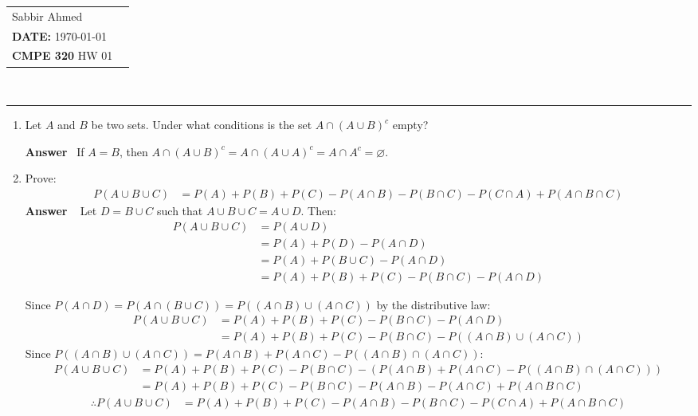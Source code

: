 \documentclass[paper=usletter, fontsize=12pt]{article}
\newcommand{\documentinfo}[5]{
    \begin{centering}
        \parbox{2in}{
        \begin{spacing}{1}
            \begin{flushleft}
                \begin{tabular}{l l}
                    #1 \\
                    #2 \\
                    #3 \\
                \end{tabular}\\
                \rule{\textwidth}{1pt}
            \end{flushleft}
        \end{spacing}
        }
    \end{centering}
}
\newcommand{\ans}{\textbf{Answer} \ }
\begin{document}
    \documentinfo{Sabbir Ahmed}{\textbf{DATE:} \today}{\textbf{CMPE 320} HW 01}
    \vspace{-0.2in}

    \begin{enumerate}

        \item Let $A$ and $B$ be two sets. Under what conditions is the set $A
        \cap (A \cup B)^c$ empty?

        \ans If $A = B$, then $A \cap (A \cup B)^c = A \cap (A \cup A)^c = A
        \cap A^c = \varnothing$.

        \item Prove:
        \begin{align*}
            P(A \cup B \cup C) & = P(A) + P(B) + P(C) - P(A \cap B) - P(B
            \cap C) - P(C \cap A) + P(A \cap B \cap C)
        \end{align*}
        \ans
        Let $D = B \cup C$ such that $A \cup B \cup C = A \cup D$. Then:
        \begin{align*}
            P(A \cup B \cup C) & = P(A \cup D) \\
            & = P(A) + P(D) - P(A \cap D) \\
            & = P(A) + P(B \cup C) - P(A \cap D) \\
            & = P(A) + P(B) + P(C) - P(B \cap C) - P(A \cap D)
        \end{align*}

        Since $P(A \cap D) = P(A \cap (B \cup C) ) = P((A \cap B) \cup (A \cap
        C))$ by the distributive law:
        \begin{align*}
        P(A \cup B \cup C) & = P(A) + P(B) + P(C) - P(B \cap C) - P(A \cap
        D) \\
        & = P(A) + P(B) + P(C) - P(B \cap C) - P((A \cap B) \cup (A \cap C))
        \end{align*}
        Since $P((A \cap B) \cup (A \cap C)) = P(A \cap B) + P(A \cap C) - P((A
        \cap B) \cap (A \cap C))$:
        \begin{align*}
        P(A \cup B \cup C) & = P(A) + P(B) + P(C) - P(B \cap C) - (P(A \cap B)
        + P(A \cap C) - P((A \cap B) \cap (A \cap C))) \\
        & = P(A) + P(B) + P(C) - P(B \cap C) - P(A \cap B) - P(A \cap C) + P(A
        \cap B \cap C)
        \end{align*}
        \begin{align*}
            \therefore P(A \cup B \cup C) & = P(A) + P(B) + P(C) - P(A \cap B)
            - P(B \cap C) - P(C \cap A) + P(A \cap B \cap C)
        \end{align*}


\end{enumerate}
\end{document}
